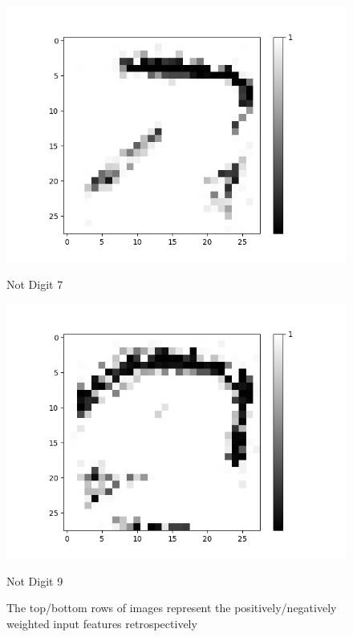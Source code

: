 \begin{figure}[H]
\begin{minipage}[b]{0.19\textwidth}
		\includegraphics[width=\textwidth]{AND(NO-LSM)/Negative/Layer0-Neuron-7.png}
		\caption{Not Digit 7}
	\end{minipage}
	\begin{minipage}[b]{0.19\textwidth}
		\captionsetup{labelformat=empty}
		\includegraphics[width=\textwidth]{AND(NO-LSM)/Negative/Layer0-Neuron-9.png}
		\caption{Not Digit 9}
	\end{minipage}
	\caption{The top/bottom rows of images represent the positively/negatively weighted input features retrospectively}
	\label{fig:and-net-new-archetchure-with-out-lsm-interp}
	\hfill
\end{figure}


